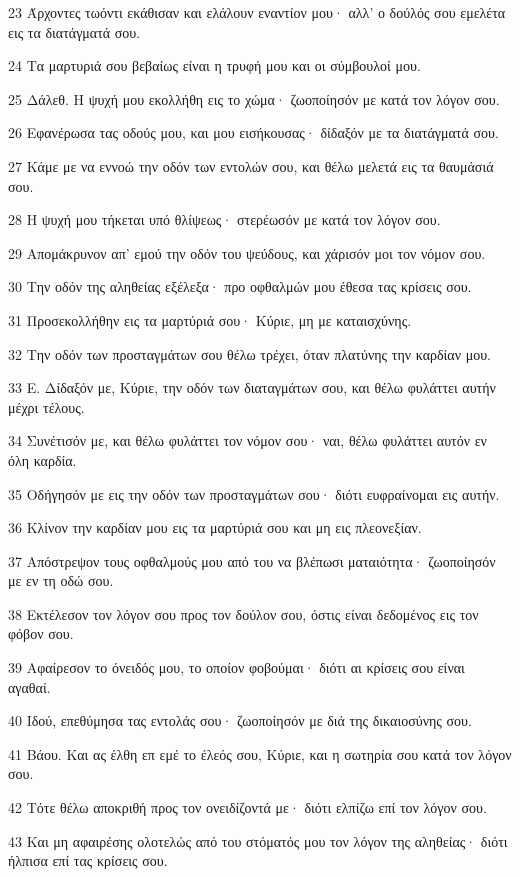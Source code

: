 \par 23 Άρχοντες τωόντι εκάθισαν και ελάλουν εναντίον μου· αλλ' ο δούλός σου εμελέτα εις τα διατάγματά σου.
\par 24 Τα μαρτυριά σου βεβαίως είναι η τρυφή μου και οι σύμβουλοί μου.
\par 25 Δάλεθ. Η ψυχή μου εκολλήθη εις το χώμα· ζωοποίησόν με κατά τον λόγον σου.
\par 26 Εφανέρωσα τας οδούς μου, και μου εισήκουσας· δίδαξόν με τα διατάγματά σου.
\par 27 Κάμε με να εννοώ την οδόν των εντολών σου, και θέλω μελετά εις τα θαυμάσιά σου.
\par 28 Η ψυχή μου τήκεται υπό θλίψεως· στερέωσόν με κατά τον λόγον σου.
\par 29 Απομάκρυνον απ' εμού την οδόν του ψεύδους, και χάρισόν μοι τον νόμον σου.
\par 30 Την οδόν της αληθείας εξέλεξα· προ οφθαλμών μου έθεσα τας κρίσεις σου.
\par 31 Προσεκολλήθην εις τα μαρτύριά σου· Κύριε, μη με καταισχύνης.
\par 32 Την οδόν των προσταγμάτων σου θέλω τρέχει, όταν πλατύνης την καρδίαν μου.
\par 33 Ε. Δίδαξόν με, Κύριε, την οδόν των διαταγμάτων σου, και θέλω φυλάττει αυτήν μέχρι τέλους.
\par 34 Συνέτισόν με, και θέλω φυλάττει τον νόμον σου· ναι, θέλω φυλάττει αυτόν εν όλη καρδία.
\par 35 Οδήγησόν με εις την οδόν των προσταγμάτων σου· διότι ευφραίνομαι εις αυτήν.
\par 36 Κλίνον την καρδίαν μου εις τα μαρτύριά σου και μη εις πλεονεξίαν.
\par 37 Απόστρεψον τους οφθαλμούς μου από του να βλέπωσι ματαιότητα· ζωοποίησόν με εν τη οδώ σου.
\par 38 Εκτέλεσον τον λόγον σου προς τον δούλον σου, όστις είναι δεδομένος εις τον φόβον σου.
\par 39 Αφαίρεσον το όνειδός μου, το οποίον φοβούμαι· διότι αι κρίσεις σου είναι αγαθαί.
\par 40 Ιδού, επεθύμησα τας εντολάς σου· ζωοποίησόν με διά της δικαιοσύνης σου.
\par 41 Βάου. Και ας έλθη επ εμέ το έλεός σου, Κύριε, και η σωτηρία σου κατά τον λόγον σου.
\par 42 Τότε θέλω αποκριθή προς τον ονειδίζοντά με· διότι ελπίζω επί τον λόγον σου.
\par 43 Και μη αφαιρέσης ολοτελώς από του στόματός μου τον λόγον της αληθείας· διότι ήλπισα επί τας κρίσεις σου.
